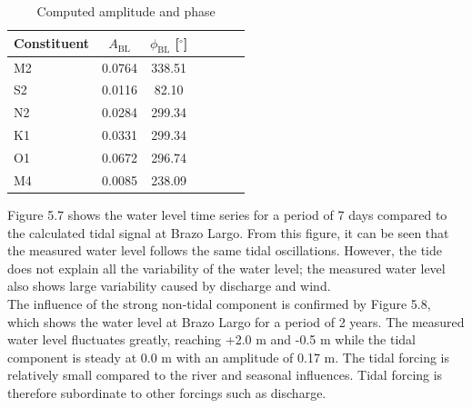 \begin{table}[H]
\centering
\setlength{\tabcolsep}{8pt} 
\caption{Computed amplitude and phase}
\begin{tabular}{lcccccc}
\hline
Constituent & $A_{\text{BL}}$ & $\phi_{\text{BL}}$ [$^\circ$] \\
\hline
M2 & 0.0764 & 338.51 \\
S2 & 0.0116 & 82.10 \\
N2 & 0.0284 & 299.34 \\
K1 & 0.0331 & 299.34  \\
O1 & 0.0672 & 296.74 \\
M4 & 0.0085 & 238.09  \\
\hline
\end{tabular}
\end{table}

Figure 5.7 shows the water level time series for a period of 7 days compared to the calculated tidal signal at Brazo Largo. From this figure, it can be seen that the measured water level follows the same tidal oscillations. However, the tide does not explain all the variability of the water level; the measured water level also shows large variability caused by discharge and wind. 
\\The influence of the strong non-tidal component is confirmed by Figure 5.8, which shows the water level at Brazo Largo for a period of 2 years. The measured water level fluctuates greatly, reaching +2.0 m and -0.5 m while the tidal component is steady at 0.0 m with an amplitude of 0.17 m. The tidal forcing is relatively small compared to the river and seasonal influences. Tidal forcing is therefore subordinate to other forcings such as discharge.

